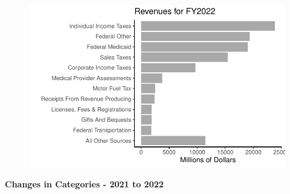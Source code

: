 \documentclass[
  letterpaper,
  DIV=11,
  numbers=noendperiod]{scrreport}
\begin{document}
\begin{figure}[H]

{\centering \includegraphics{./Everything_files/figure-pdf/unnamed-chunk-10-2.pdf}

}

\end{figure}

\textbf{Changes in Categories - 2021 to 2022}
\end{document}
